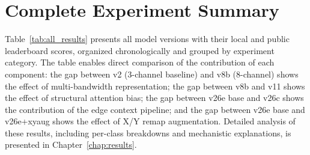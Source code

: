 \section{Complete Experiment Summary}
\label{sec:exp_summary}

Table~\ref{tab:all_results} presents all model versions with their local and public leaderboard scores, organized chronologically and grouped by experiment category. The table enables direct comparison of the contribution of each component: the gap between v2 (3-channel baseline) and v8b (8-channel) shows the effect of multi-bandwidth representation; the gap between v8b and v11 shows the effect of structural attention bias; the gap between v26e base and v26c shows the contribution of the edge context pipeline; and the gap between v26e base and v26e+xyaug shows the effect of X/Y remap augmentation. Detailed analysis of these results, including per-class breakdowns and mechanistic explanations, is presented in Chapter~\ref{chap:results}.

